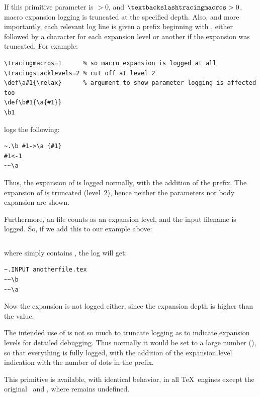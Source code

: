 \documentclass{pdftexmanual}
\begin{document}
If this primitive parameter is $>0$, and $\cs{tracingmacros}>0$, macro
expansion logging is truncated at the specified depth. Also, and more
importantly, each relevant log line is given a prefix beginning with
\type{~}, either followed by a  character for each expansion
level or another \type{~} if the expansion was truncated. For example:

\begin{verbatim}
\tracingmacros=1      % so macro expansion is logged at all
\tracingstacklevels=2 % cut off at level 2
\def\a#1{\relax}      % argument to show parameter logging is affected too
\def\b#1{\a{#1}}
\b1
\end{verbatim}

\noindent logs the following:

\begin{verbatim}
~.\b #1->\a {#1}
#1<-1
~~\a 
\end{verbatim}

Thus, the expansion of  is logged normally, with the addition
of the  prefix. The expansion of  is truncated
(level~2), hence neither the parameters nor body expansion are shown.

Furthermore, an  file counts as an expansion level, and the
input filename is logged. So, if we add this to our example above:
\begin{verbatim}

\end{verbatim}

\noindent where  simply contains , the log
will get:

\begin{verbatim}
~.INPUT anotherfile.tex
~~\b 
~~\a 
\end{verbatim}

Now the  expansion is not logged either, since the expansion
depth is higher than the  value.

The intended use of  is not so much to truncate
logging as to indicate expansion levels for detailed debugging. Thus
normally it would be set to a large number (), so that
everything is fully logged, with the addition of the expansion level
indication with the number of dots in the prefix.

This primitive is available, with identical behavior, in all \TeX\
engines except the original \TEX\ and \eTeX, where
 remains undefined. 
\end{document}
